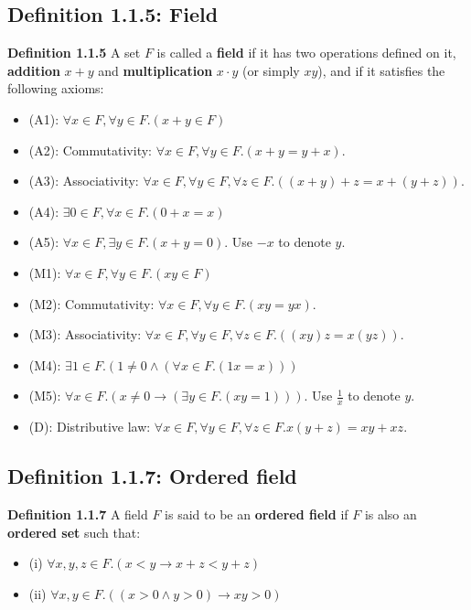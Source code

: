 \documentclass[12pt, letterpaper, oneside]{book}
\begin{document}
\subsection{Definition 1.1.5: Field}

\textbf{Definition 1.1.5} A set $F$ is called a \textbf{field} if it has two operations defined on it, \textbf{addition}
$x + y$ and \textbf{multiplication} $x \cdot y$ (or simply $xy$), and if it satisfies the following axioms:
\begin{itemize}
  \item (A1): $\forall x \in F, \forall y \in F. (x + y \in F)$
  \item (A2): Commutativity: $\forall x \in F, \forall y \in F. (x + y = y + x)$.
  \item (A3): Associativity: $\forall x \in F, \forall y \in F, \forall z \in F. ((x + y) + z = x + (y + z))$.
  \item (A4): $\exists 0 \in F, \forall x \in F. (0 + x = x)$
  \item (A5): $\forall x \in F, \exists y \in F. (x + y = 0)$. Use $-x$ to denote $y$.
  \item (M1): $\forall x \in F, \forall y \in F. (xy \in F)$
  \item (M2): Commutativity: $\forall x \in F, \forall y \in F. (xy = yx)$.
  \item (M3): Associativity: $\forall x \in F, \forall y \in F, \forall z \in F. ((xy)z = x(yz))$.
  \item (M4): $\exists 1 \in F. (1 \ne 0 \land (\forall x \in F. (1x = x)))$
  \item (M5): $\forall x \in F. (x \ne 0 \rightarrow (\exists y \in F. (xy = 1)))$. Use $\frac{1}{x}$ to denote $y$.
  \item (D): Distributive law: $\forall x \in F, \forall y \in F, \forall z \in F. x(y + z) = xy + xz$.
\end{itemize}

\subsection{Definition 1.1.7: Ordered field}

\textbf{Definition 1.1.7} A field $F$ is said to be an \textbf{ordered field} if $F$ is also an \textbf{ordered set}
such that:
\begin{itemize}
  \item (i) $\forall x, y, z \in F. (x < y \rightarrow x + z < y + z)$
  \item (ii) $\forall x, y \in F. ((x > 0 \land y > 0) \rightarrow xy > 0)$
\end{itemize}
\end{document}
